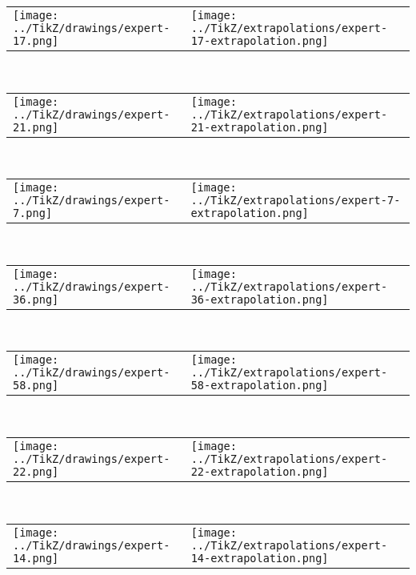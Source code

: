 
            \begin{tabular}{ll}
    \texttt{[image: ../TikZ/drawings/expert-17.png]}&
    \texttt{[image: ../TikZ/extrapolations/expert-17-extrapolation.png]}
    \end{tabular}        
            \\

            \begin{tabular}{ll}
    \texttt{[image: ../TikZ/drawings/expert-21.png]}&
    \texttt{[image: ../TikZ/extrapolations/expert-21-extrapolation.png]}
    \end{tabular}        
            \\

            \begin{tabular}{ll}
    \texttt{[image: ../TikZ/drawings/expert-7.png]}&
    \texttt{[image: ../TikZ/extrapolations/expert-7-extrapolation.png]}
    \end{tabular}        
            \\

            \begin{tabular}{ll}
    \texttt{[image: ../TikZ/drawings/expert-36.png]}&
    \texttt{[image: ../TikZ/extrapolations/expert-36-extrapolation.png]}
    \end{tabular}        
            \\

            \begin{tabular}{ll}
    \texttt{[image: ../TikZ/drawings/expert-58.png]}&
    \texttt{[image: ../TikZ/extrapolations/expert-58-extrapolation.png]}
    \end{tabular}        
            \\

            \begin{tabular}{ll}
    \texttt{[image: ../TikZ/drawings/expert-22.png]}&
    \texttt{[image: ../TikZ/extrapolations/expert-22-extrapolation.png]}
    \end{tabular}        
            \\

            \begin{tabular}{ll}
    \texttt{[image: ../TikZ/drawings/expert-14.png]}&
    \texttt{[image: ../TikZ/extrapolations/expert-14-extrapolation.png]}
    \end{tabular}        
            \\

